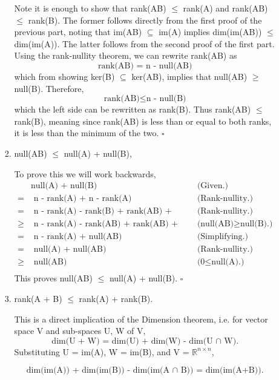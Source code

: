 \documentclass[12pt]{article}
\newcommand{\hop}{\vspace{1mm}}
\newcommand{\jump}{\vspace{5mm}}
\newcommand{\R}{\mathbb{R}}
\begin{document}
\begin{enumerate}[leftmargin=\labelsep]
\begin{enumerate}
\begin{enumerate}
        Note it is enough to show that rank(AB) $\leq$ rank(A) and rank(AB) $\leq$ rank(B). The former follows directly from the first proof of the previous part, noting that im(AB) $\subseteq$ im(A) implies dim(im(AB)) $\leq$ dim(im(A)). The latter follows from the second proof of the first part. Using the rank-nullity theorem, we can rewrite rank(AB) as
        \[
        \text{rank(AB) = n - null(AB)}
        \]
        which from showing ker(B) $\subseteq$ ker(AB), implies that null(AB) $\geq$ null(B). Therefore,
        \[
        \text{rank(AB)} \leq \text{n - null(B)}
        \]
        which the left side can be rewritten as rank(B). Thus rank(AB) $\leq$ rank(B), meaning since rank(AB) is less than or equal to both ranks, it is less than the minimum of the two. $\square$
        \hop
        \item null(AB) $\leq$ null(A) + null(B), 
        \jump

        To prove this we will work backwards,
        \begin{align*}
        &\text{null(A) + null(B)} &\text{(Given.)}  \\
        =&\text{ n - rank(A) + n - rank(A)}  &\text{(Rank-nullity.)} \\
        =&\text{ n - rank(A) - rank(B) + rank(AB) + null(AB)} &\text{(Rank-nullity.)} \\
        \geq&\text{ n - rank(A) - rank(AB) + rank(AB) + null(AB)} &\text{(null(AB)} \geq \text{null(B).)}   \\
        =&\text{ n - rank(A) + null(AB)}    &\text{(Simplifying.)}  \\
        =&\text{ null(A) + null(AB)}    &\text{(Rank-nullity.)}    \\
        \geq&\text{ null(AB)}   &\text{(0} \leq \text{null(A).)} \\
        \end{align*}
        This proves null(AB) $\leq$ null(A) + null(B). $\square$
        \hop
        \item rank(A + B) $\leq$ rank(A) + rank(B).
        \jump

        This is a direct implication of the Dimension theorem, i.e. for vector space V and sub-spaces U, W of V, 
        \[
        \text{dim(U + W) = dim(U) + dim(W) - dim(U } \cap \text{ W).}
        \]
        Substituting U = im(A), W = im(B), and V = $\R^{n\times n}$,
        
        \[
        \text{dim(im(A)) + dim(im(B)) - dim(im(A } \cap \text{ B)) = dim(im(A+B)).}
        \]
        

\end{enumerate}
\end{enumerate}
\end{enumerate}
\end{document}
